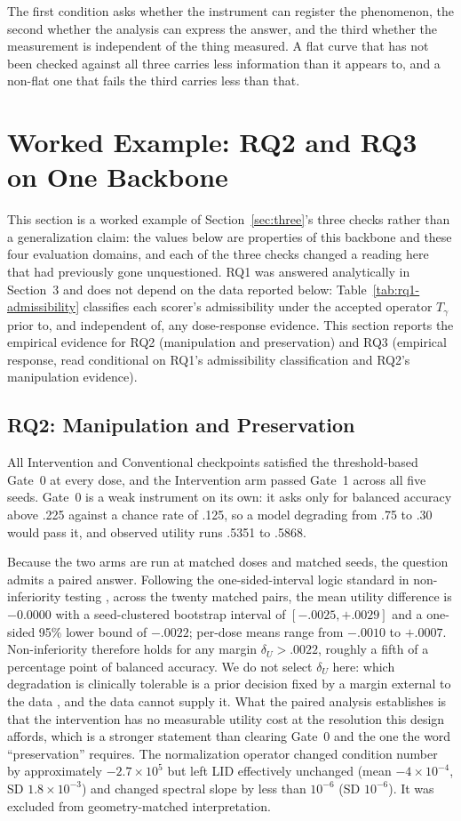 \documentclass[pdflatex,sn-basic]{sn-jnl}
\theoremstyle{plain}
\theoremstyle{definition}
\theoremstyle{remark}
\begin{document}
The first condition asks whether the instrument can register the phenomenon,
the second whether the analysis can express the answer, and the third whether
the measurement is independent of the thing measured. A flat curve that has not
been checked against all three carries less information than it appears to, and
a non-flat one that fails the third carries less than that.

\section{Worked Example: RQ2 and RQ3 on One Backbone}
This section is a worked example of Section~\ref{sec:three}'s three checks
rather than a generalization claim: the values below are properties of this
backbone and these four evaluation domains, and each of the three checks
changed a reading here that had previously gone unquestioned.
RQ1 was answered analytically in Section~3 and does not depend on the data reported below: Table~\ref{tab:rq1-admissibility} classifies each scorer's admissibility under the accepted operator $T_\gamma$ prior to, and independent of, any dose-response evidence. This section reports the empirical evidence for RQ2 (manipulation and preservation) and RQ3 (empirical response, read conditional on RQ1's admissibility classification and RQ2's manipulation evidence).
\subsection{RQ2: Manipulation and Preservation}
\label{sec:rq2-manipulation}
All Intervention and Conventional checkpoints satisfied the threshold-based Gate~0 at every dose, and the Intervention arm passed Gate~1 across all five seeds. Gate~0 is a weak instrument on its own: it asks only for balanced accuracy above .225 against a chance rate of .125, so a model degrading from .75 to .30 would pass it, and observed utility runs .5351 to .5868.

Because the two arms are run at matched doses and matched seeds, the question admits a paired answer. Following the one-sided-interval logic standard in non-inferiority testing \citep{walker2011understanding}, across the twenty matched pairs, the mean utility difference is $-0.0000$ with a seed-clustered bootstrap interval of $[-.0025,+.0029]$ and a one-sided 95\% lower bound of $-.0022$; per-dose means range from $-.0010$ to $+.0007$. Non-inferiority therefore holds for any margin $\delta_U>.0022$, roughly a fifth of a percentage point of balanced accuracy. We do not select $\delta_U$ here: which degradation is clinically tolerable is a prior decision fixed by a margin external to the data \citep{walker2011understanding}, and the data cannot supply it. What the paired analysis establishes is that the intervention has no measurable utility cost at the resolution this design affords, which is a stronger statement than clearing Gate~0 and the one the word ``preservation'' requires. The normalization operator changed condition number by approximately $-2.7\times10^{5}$ but left LID effectively unchanged (mean $-4\times10^{-4}$, SD $1.8\times10^{-3}$) and changed spectral slope by less than $10^{-6}$ (SD $10^{-6}$). It was excluded from geometry-matched interpretation.
\end{document}
